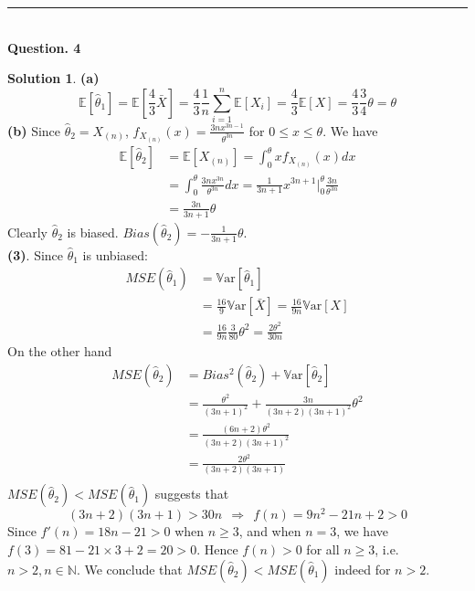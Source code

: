 \documentclass[a4paper, 10pt]{article}
\theoremstyle{definition}
\theoremstyle{hSol}
\newtheorem*{solution}{Solution}
\begin{document}
\noindent\rule{16cm}{0.4pt}
~\\
\textbf{Question. 4}
\begin{solution} \textbf{(a)} 
\begin{equation}
  \mathbb{E}\left[\hat{\theta}_1\right] = \mathbb{E}\left[\frac{4}{3}\bar{X}\right] = \frac{4}{3} \frac{1}{n}\sum_{i=1}^n \mathbb{E}\left[X_i\right] = \frac{4}{3} \mathbb{E}\left[X\right] = \frac{4}{3}\frac{3}{4}\theta = \theta
\end{equation}
\textbf{(b)} Since $\hat{\theta}_2 = X_{(n)}$, $f_{X_{(n)}}(x) = \frac{3n x^{3n-1}}{\theta^{3n}}$ for $0\leq x \leq \theta$. We have
\begin{equation}
  \begin{split}
    \mathbb{E}\left[\hat{\theta}_2\right] &= \mathbb{E}\left[X_{(n)}\right] = \int_{0}^{\theta} x f_{X_{(n)}}(x)dx \\
    &=\int_{0}^{\theta} \frac{3n x^{3n}}{\theta^{3n}}dx = \frac{1}{3n+1}x^{3n+1}\biggr\rvert_0^{\theta} \frac{3n}{\theta^{3n}} \\
    &= \frac{3n}{3n+1}\theta
  \end{split}
\end{equation}
Clearly $\hat{\theta}_2$ is biased. $Bias(\hat{\theta}_2) = -\frac{1}{3n+1}\theta$. \\
\textbf{(3)}. Since $\hat{\theta}_1$ is unbiased:
\begin{equation}
  \begin{split}
    MSE(\hat{\theta}_1) &= \mathrm{\mathbb{V}ar}\left[\hat{\theta}_1\right] \\
    &=\frac{16}{9} \mathrm{\mathbb{V}ar}\left[\bar{X}\right] = \frac{16}{9n}\mathrm{\mathbb{V}ar}\left[X\right]  \\
    &=\frac{16}{9n} \frac{3}{80}\theta^2 = \frac{2\theta^2}{30n}
  \end{split}
\end{equation}
On the other hand
\begin{equation}
  \begin{split}
    MSE(\hat{\theta}_2) &= Bias^2(\hat{\theta}_2) + \mathrm{\mathbb{V}ar}[\hat{\theta}_2] \\
    &=\frac{\theta^2}{(3n+1)^2} + \frac{3n}{(3n+2)(3n+1)^2}\theta^2 \\
    &= \frac{(6n+2)\theta^2}{(3n+2)(3n+1)^2} \\
    &=\frac{2\theta^2}{(3n+2)(3n+1)} \\
  \end{split}
\end{equation}
$MSE(\hat{\theta}_2) < MSE(\hat{\theta}_1)$ suggests that 
$$
(3n+2)(3n+1) > 30n ~~\Rightarrow~~f(n)=9n^2 - 21n + 2>0
$$
Since $f'(n) = 18n - 21 > 0$ when $n\geq 3$, and when $n=3$, we have $f(3)=81-21\times 3 + 2= 20 >0$. Hence $f(n)>0$ for all $n\geq 3$, i.e. $n>2, n\in \mathbb{N}$. We conclude that $MSE(\hat{\theta}_2) < MSE(\hat{\theta}_1)$ indeed for $n>2$.

\end{solution}
\end{document}
